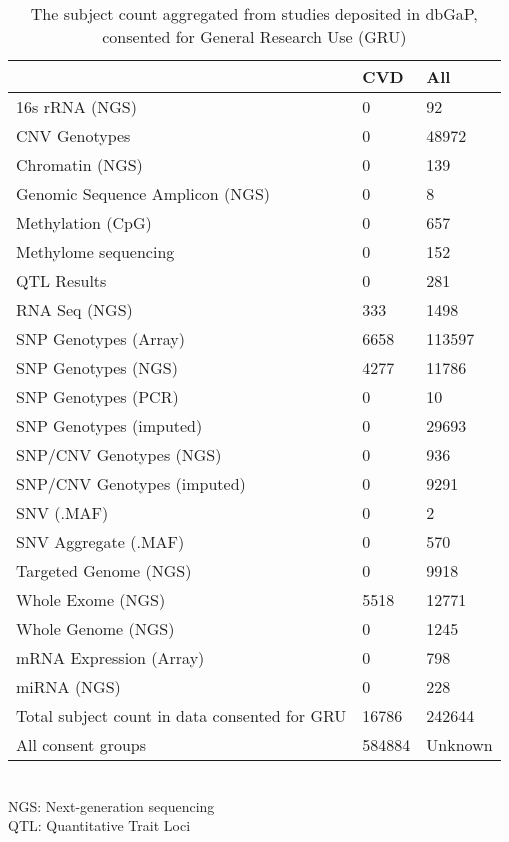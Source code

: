 \documentclass[11pt,letterpaper]{article}
\begin{document}
	\begin{table}[]
		\caption{The subject count aggregated from studies deposited in dbGaP, consented for General Research Use (GRU)
			\label{tab:dbgapSubject}}
		{\begin{tabular}{l l l}
				\hline
				& \textbf{CVD} &  \textbf{All}                         \\ \hline
				16s rRNA (NGS)                 &     0 &      92 \\
				CNV Genotypes                  &     0 &   48972 \\
				Chromatin (NGS)                &     0 &     139 \\
				Genomic Sequence Amplicon (NGS)&     0 &       8 \\
				Methylation (CpG)              &     0 &     657 \\
				Methylome sequencing           &     0 &     152 \\
				QTL Results                    &     0 &     281 \\
				RNA Seq (NGS)                  &   333 &    1498 \\
				SNP Genotypes (Array)          &  6658 &  113597 \\
				SNP Genotypes (NGS)            &  4277 &   11786 \\
				SNP Genotypes (PCR)            &     0 &      10 \\
				SNP Genotypes (imputed)        &     0 &   29693 \\
				SNP/CNV Genotypes (NGS)        &     0 &     936 \\
				SNP/CNV Genotypes (imputed)    &     0 &    9291 \\
				SNV (.MAF)                     &     0 &       2 \\
				SNV Aggregate (.MAF)           &     0 &     570 \\
				Targeted Genome (NGS)          &     0 &    9918 \\
				Whole Exome (NGS)              &  5518 &   12771 \\
				Whole Genome (NGS)             &     0 &    1245 \\
				mRNA Expression (Array)        &     0 &     798 \\
				miRNA (NGS)                        & 0 &   228 \\ \hline
				Total subject count in data consented for GRU & 16786 & 242644 \\ \hline
				All consent groups & 584884 & Unknown \\	\hline
		\end{tabular}}\\ \newline
	\footnotesize{NGS: Next-generation sequencing\\ QTL: Quantitative Trait Loci}
	\end{table}
\end{document}
